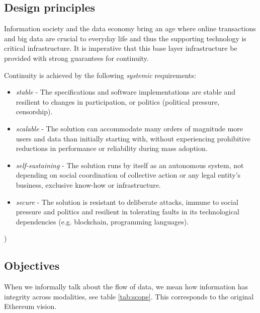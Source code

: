 \subsection{Design principles \statusorange}\label{sec:design-principles}
 

Information society and the data economy bring an age where online transactions and big data are crucial to everyday life and thus the supporting technology is critical infrastructure. It is imperative that this base layer infrastructure be provided with strong guarantees for continuity. 

Continuity is achieved by the following \emph{systemic} requirements:

\begin{itemize}
\item \emph{stable} - The specifications and software implementations are stable and resilient to changes in participation, or politics (political pressure, censorship).
\item \emph{scalable} - The solution can accommodate many orders of magnitude more users and data than initially starting with, without experiencing prohibitive reductions in performance or reliability during mass adoption.
\item \emph{self-sustaining} - The solution runs by itself as an autonomous system, not depending on social coordination of collective action or any legal entity's business, exclusive know-how or infrastructure.   
\item \emph{secure} - The solution is resistant to deliberate attacks, immune to  social pressure and politics and resilient in tolerating faults in its technological dependencies (e.g. blockchain, programming languages). 
\end{itemize}
)



\subsection{Objectives \statusyellow}\label{sec:objectives}


When we informally talk about the flow of data, we mean how information has  integrity across modalities, see table \ref{tab:scope}. This corresponds to the original Ethereum vision.

